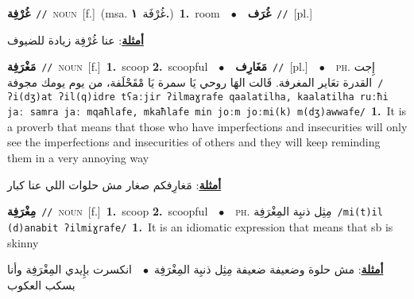 \documentclass[10pt,a4paper,twoside]{article} %
\begin{document}
\begin{multicols}{2}
{\setlength\topsep{0pt}\textbf{\foreignlanguage{arabic}{غُرْفِة}}\ {\color{gray}\texttt{//}\color{black}}\ \textsc{noun}\ [f.]\ \color{gray}(msa. \foreignlanguage{arabic}{غُرْفَة}~\foreignlanguage{arabic}{\textbf{١.}})\color{black}\ \textbf{1.}~room\ \ $\bullet$\ \ \setlength\topsep{0pt}\textbf{\foreignlanguage{arabic}{غُرَف}}\ {\color{gray}\texttt{//}\color{black}}\ [pl.]\  \begin{flushright}\color{gray}\foreignlanguage{arabic}{\textbf{\underline{\foreignlanguage{arabic}{أمثلة}}}: عنا غُرْفِة زيادة للضيوف}\end{flushright}\color{black}} \vspace{2mm}

{\setlength\topsep{0pt}\textbf{\foreignlanguage{arabic}{مَغْرَفِة}}\ {\color{gray}\texttt{//}\color{black}}\ \textsc{noun}\ [f.]\ \textbf{1.}~scoop  \textbf{2.}~scoopful\ \ $\bullet$\ \ \setlength\topsep{0pt}\textbf{\foreignlanguage{arabic}{مَغَارِف}}\ {\color{gray}\texttt{//}\color{black}}\ [pl.]\ \ $\bullet$\ \ \textsc{ph.} \color{gray} \foreignlanguage{arabic}{إِجت القدرة تعَاير المغرفة. قَالت الهَا روحي يَا سمرة يَا مْقَحْلَفة، من يوم يومك مجوفة}\color{black}\ {\color{gray}\texttt{/{\sffamily ʔi(dʒ)at ʔil(q)idre tʕaːjir ʔilmaɣrafe qaalatilha, kaalatilha ruːħi jaː samra jaː mqaħlafe, mkaħlafe min joːm joːmi(k) m(dʒ)awwafe}/}\color{black}}\ \textbf{1.}~It is a proverb that means that those who have imperfections and insecurities will only see the  imperfections and insecurities of others and they will keep reminding them in a very annoying way\  \begin{flushright}\color{gray}\foreignlanguage{arabic}{\textbf{\underline{\foreignlanguage{arabic}{أمثلة}}}: مَغارِفكم صغار مش حلوات اللي عنا كبار}\end{flushright}\color{black}} \vspace{2mm}

{\setlength\topsep{0pt}\textbf{\foreignlanguage{arabic}{مِغْرَفِة}}\ {\color{gray}\texttt{//}\color{black}}\ \textsc{noun}\ [f.]\ \textbf{1.}~scoop  \textbf{2.}~scoopful\ \ $\bullet$\ \ \textsc{ph.} \color{gray} \foreignlanguage{arabic}{مِثِل ذنبِة المِغْرَفِة}\color{black}\ {\color{gray}\texttt{/{\sffamily mi(t)il (d)anabit ʔilmiɣrafe}/}\color{black}}\ \textbf{1.}~It is an idiomatic expression that means that sb is skinny\  \begin{flushright}\color{gray}\foreignlanguage{arabic}{\textbf{\underline{\foreignlanguage{arabic}{أمثلة}}}: مش حلوة وضعيفة ضعيفة مِثِل ذنبِة المِغْرَفِة\ $\bullet$\ \  انكسرت بإِيدي المِغْرَفِة وأنا بسكب العكوب}\end{flushright}\color{black}} \vspace{2mm}


\end{multicols}
\end{document}
